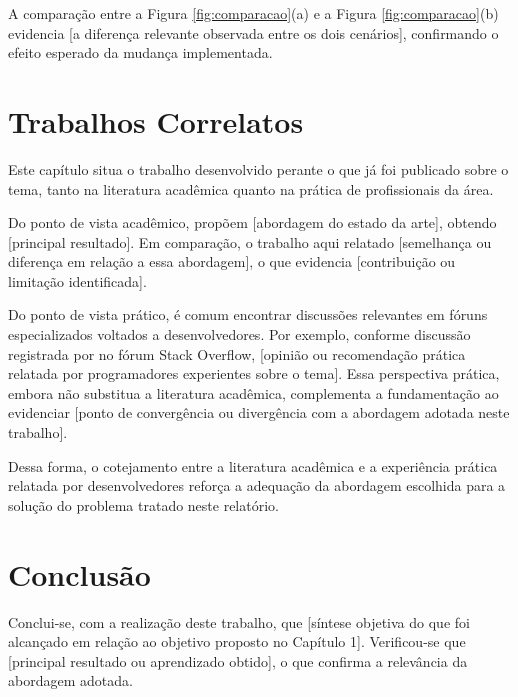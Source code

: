 \documentclass[
    12pt,
    openright,
    oneside,
    a4paper,
    brazil
]{abntex2}
\begin{document}
A comparação entre a Figura \ref{fig:comparacao}(a) e a Figura \ref{fig:comparacao}(b) evidencia [a diferença relevante observada entre os dois cenários], confirmando o efeito esperado da mudança implementada.

\chapter{Trabalhos Correlatos}

Este capítulo situa o trabalho desenvolvido perante o que já foi publicado sobre o tema, tanto na literatura acadêmica quanto na prática de profissionais da área.

Do ponto de vista acadêmico,  propõem [abordagem do estado da arte], obtendo [principal resultado]. Em comparação, o trabalho aqui relatado [semelhança ou diferença em relação a essa abordagem], o que evidencia [contribuição ou limitação identificada].

Do ponto de vista prático, é comum encontrar discussões relevantes em fóruns especializados voltados a desenvolvedores. Por exemplo, conforme discussão registrada por  no fórum Stack Overflow, [opinião ou recomendação prática relatada por programadores experientes sobre o tema]. Essa perspectiva prática, embora não substitua a literatura acadêmica, complementa a fundamentação ao evidenciar [ponto de convergência ou divergência com a abordagem adotada neste trabalho].

Dessa forma, o cotejamento entre a literatura acadêmica e a experiência prática relatada por desenvolvedores reforça a adequação da abordagem escolhida para a solução do problema tratado neste relatório.

\chapter{Conclusão}

Conclui-se, com a realização deste trabalho, que [síntese objetiva do que foi alcançado em relação ao objetivo proposto no Capítulo 1]. Verificou-se que [principal resultado ou aprendizado obtido], o que confirma a relevância da abordagem adotada.
\end{document}
